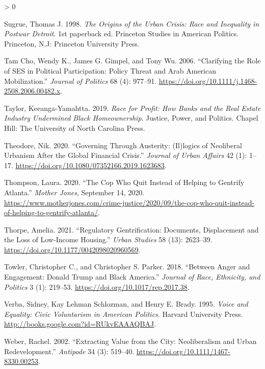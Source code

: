 \documentclass[
  12pt,
]{article}
\newlength{\cslhangindent}
\newenvironment{CSLReferences}[2] %
 {%
  \setlength{\parindent}{0pt}
  \ifodd #1 \everypar{\setlength{\hangindent}{\cslhangindent}}\ignorespaces\fi
  \ifnum #2 > 0
  \setlength{\parskip}{#2\baselineskip}
  \fi
 }%
 {}
\begin{document}
\begin{CSLReferences}{1}{0}
\leavevmode\hypertarget{ref-Sugrue1998}{}%
Sugrue, Thomas J. 1998. \emph{The Origins of the Urban Crisis: Race and Inequality in Postwar {Detroit}}. 1st paperback ed. Princeton Studies in {American} Politics. {Princeton, N.J}: {Princeton University Press}.

\leavevmode\hypertarget{ref-TamCho2006a}{}%
Tam Cho, Wendy K., James G. Gimpel, and Tony Wu. 2006. {``Clarifying the {Role} of {SES} in {Political Participation}: {Policy Threat} and {Arab American Mobilization}.''} \emph{Journal of Politics} 68 (4): 977--91. \url{https://doi.org/10.1111/j.1468-2508.2006.00482.x}.

\leavevmode\hypertarget{ref-Taylor2019}{}%
Taylor, Keeanga-Yamahtta. 2019. \emph{Race for Profit: How Banks and the Real Estate Industry Undermined Black Homeownership}. Justice, Power, and Politics. {Chapel Hill}: {The University of North Carolina Press}.

\leavevmode\hypertarget{ref-Theodore2020}{}%
Theodore, Nik. 2020. {``Governing Through Austerity: ({Il})logics of Neoliberal Urbanism After the Global Financial Crisis.''} \emph{Journal of Urban Affairs} 42 (1): 1--17. \url{https://doi.org/10.1080/07352166.2019.1623683}.

\leavevmode\hypertarget{ref-Thompson2020}{}%
Thompson, Laura. 2020. {``The Cop Who Quit Instead of Helping to Gentrify {Atlanta}.''} \emph{Mother Jones}, September 14, 2020. \url{https://www.motherjones.com/crime-justice/2020/09/the-cop-who-quit-instead-of-helping-to-gentrify-atlanta/}.

\leavevmode\hypertarget{ref-Thorpe2021}{}%
Thorpe, Amelia. 2021. {``Regulatory Gentrification: {Documents}, Displacement and the Loss of Low-Income Housing.''} \emph{Urban Studies} 58 (13): 2623--39. \url{https://doi.org/10.1177/0042098020960569}.

\leavevmode\hypertarget{ref-Towler2018}{}%
Towler, Christopher C., and Christopher S. Parker. 2018. {``Between {Anger} and {Engagement}: {Donald Trump} and {Black America}.''} \emph{Journal of Race, Ethnicity, and Politics} 3 (1): 219--53. \url{https://doi.org/10.1017/rep.2017.38}.

\leavevmode\hypertarget{ref-Verba1995}{}%
Verba, Sidney, Kay Lehman Schlozman, and Henry E. Brady. 1995. \emph{Voice and {Equality}: {Civic Voluntarism} in {American Politics}}. {Harvard University Press}. \url{http://books.google.com?id=RUkvEAAAQBAJ}.

\leavevmode\hypertarget{ref-Weber2002}{}%
Weber, Rachel. 2002. {``Extracting {Value} from the {City}: {Neoliberalism} and {Urban Redevelopment}.''} \emph{Antipode} 34 (3): 519--40. \url{https://doi.org/10.1111/1467-8330.00253}.


\end{CSLReferences}
\end{document}
